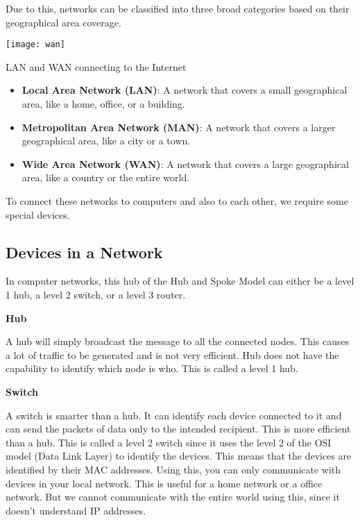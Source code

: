 Due to this, networks can be classified into three
broad categories based on their geographical area
coverage.

\begin{marginfigure}
\texttt{[image: wan]}
\caption{LAN and WAN connecting to the Internet}
\end{marginfigure}

\begin{itemize}
\item \textbf{Local Area Network (LAN)}: A network
that covers a small geographical area, like a
home, office, or a building.
\item \textbf{Metropolitan Area Network (MAN)}:
A network that covers a larger geographical area,
like a city or a town.
\item \textbf{Wide Area Network (WAN)}: A network
that covers a large geographical area, like a
country or the entire world.
\end{itemize}

To connect these networks to computers and also
to each other, we require some special devices.

\subsection{Devices in a Network}

In computer networks, this hub of the
Hub and Spoke Model can either be a
level 1 hub, a level 2 switch, or a level 3 router.

\textbf{Hub}

A hub will simply broadcast the message to all
the connected nodes. This causes a lot of traffic
to be generated and is not very efficient. Hub does
not have the capability to identify which node
is who. This is called a level 1 hub.

\textbf{Switch}

A switch is smarter than a hub. It can identify
each device connected to it and can send the
packets of data only to the intended recipient.
This is more efficient than a hub. This is called
a level 2 switch since it uses the level 2 of the
OSI model (Data Link Layer) to identify the devices.
This means that the devices are identified by their
MAC addresses.
Using this, you can only communicate with devices
in your local network. This is useful for a home
network or a office network. But we cannot communicate
with the entire world using this, since it doesn't
understand IP addresses.

